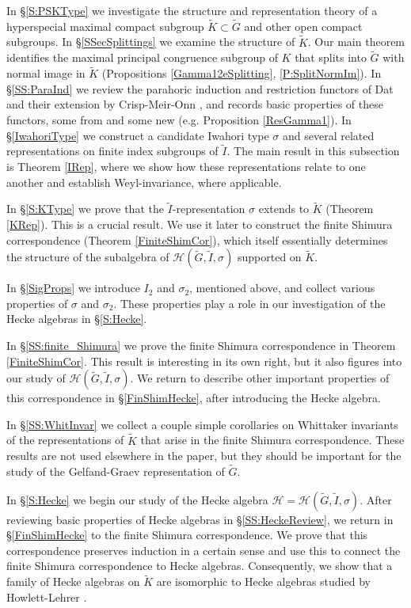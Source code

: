 \documentclass[10pt, letterpaper]{amsart}
\theoremstyle{plain}
\theoremstyle{definition}
\numberwithin{equation}{section}
\newcommand{\Gt}{\widetilde{G}}
\newcommand{\It}{\widetilde{I}}
\newcommand{\Kt}{\widetilde{K}}
\newcommand{\Hcal}{\mathcal{H}}
\begin{document}
In \S \ref{S:PSKType} we investigate the structure and representation theory of a hyperspecial maximal compact subgroup $\Kt\subset\Gt$ and other open compact subgroups. In \S \ref{SSecSplittings} we examine the structure of $\Kt$. Our main theorem identifies the maximal principal congruence subgroup of $K$ that splits into $\Gt$ with normal image in $\Kt$ (Propositions \ref{Gamma12eSplitting}, \ref{P:SplitNormIm}). In \S \ref{SS:ParaInd} we review the parahoric induction and restriction functors of Dat \cite{D09} and their extension by Crisp-Meir-Onn \cite{CMO19}, and records basic properties of these functors, some from \cite{D09,CMO19} and some new (e.g. Proposition \ref{ResGamma1}). In \S \ref{IwahoriType} we construct a candidate Iwahori type $\sigma$ and several related representations on finite index subgroups of $\It$. The main result in this subsection is Theorem \ref{IRep}, where we show how these representations relate to one another and establish Weyl-invariance, where applicable.

In \S \ref{S:KType} we prove that the $\It$-representation $\sigma$ extends to $\Kt$ (Theorem \ref{KRep}). This is a crucial result. We use it later to construct the finite Shimura correspondence (Theorem \ref{FiniteShimCor}), which itself essentially determines the structure of the subalgebra of $\Hcal(\Gt,\It,\sigma)$ supported on $\Kt$.

In \S \ref{SigProps} we introduce $I_{2}$ and $\sigma_{2}$, mentioned above, and collect various properties of $\sigma$ and $\sigma_{2}$. These properties play a role in our investigation of the Hecke algebras in \S \ref{S:Hecke}.

In \S \ref{SS:finite_Shimura} we prove the finite Shimura correspondence in Theorem \ref{FiniteShimCor}. This result is interesting in its own right, but it also figures into our study of $\Hcal(\Gt,\It,\sigma)$. We return to describe other important properties of this correspondence in \S \ref{FinShimHecke}, after introducing the Hecke algebra.

In \S \ref{SS:WhitInvar} we collect a couple simple corollaries on Whittaker invariants of the representations of $\Kt$ that arise in the finite Shimura correspondence. These results are not used elsewhere in the paper, but they should be important for the study of the Gelfand-Graev representation of $\Gt$. 

In \S \ref{S:Hecke} we begin our study of the Hecke algebra $\Hcal=\Hcal(\Gt,\It,\sigma)$. After reviewing basic properties of Hecke algebras in \S \ref{SS:HeckeReview}, we return in \S \ref{FinShimHecke} to the finite Shimura correspondence. We prove that this correspondence preserves induction in a certain sense and use this to connect the finite Shimura correspondence to Hecke algebras. Consequently, we show that a family of Hecke algebras on $\Kt$ are isomorphic to Hecke algebras studied by Howlett-Lehrer \cite{HL80}.
\end{document}
